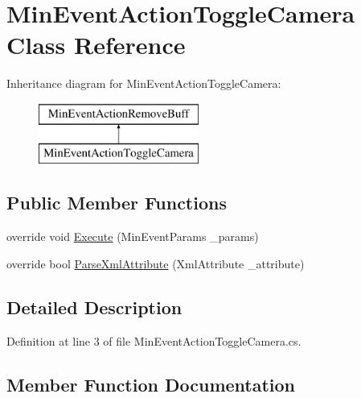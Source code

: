 \hypertarget{class_min_event_action_toggle_camera}{}\section{Min\+Event\+Action\+Toggle\+Camera Class Reference}
\label{class_min_event_action_toggle_camera}
Inheritance diagram for Min\+Event\+Action\+Toggle\+Camera\+:\begin{figure}[H]
\begin{center}
\leavevmode
\includegraphics[height=2.000000cm]{class_min_event_action_toggle_camera}
\end{center}
\end{figure}
\subsection*{Public Member Functions}
\begin{DoxyCompactItemize}
\item 
override void \mbox{\hyperlink{class_min_event_action_toggle_camera_aa548a12db0ee78dcffcbaef579a21213}{Execute}} (Min\+Event\+Params \+\_\+params)
\item 
override bool \mbox{\hyperlink{class_min_event_action_toggle_camera_accf1db5c6da943b8112bda03eba4d453}{Parse\+Xml\+Attribute}} (Xml\+Attribute \+\_\+attribute)
\end{DoxyCompactItemize}


\subsection{Detailed Description}


Definition at line 3 of file Min\+Event\+Action\+Toggle\+Camera.\+cs.



\subsection{Member Function Documentation}
\mbox{\label{class_min_event_action_toggle_camera_aa548a12db0ee78dcffcbaef579a21213}} 
